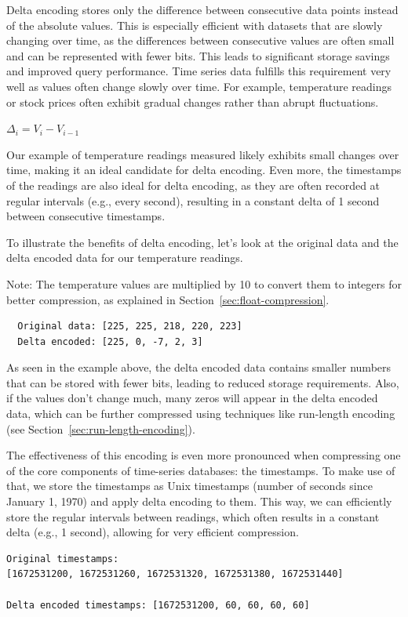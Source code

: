 Delta encoding stores only the difference between consecutive data points
instead of the absolute values. This is especially efficient with datasets that
are slowly changing over time, as the differences between consecutive values
are often small and can be represented with fewer bits. This leads to
significant storage savings and improved query performance. Time series data
fulfills this requirement very well as values often change slowly over time.
For example, temperature readings or stock prices often exhibit gradual changes
rather than abrupt fluctuations.

$\Delta_i = V_i - V_{i-1}$

Our example of temperature readings measured likely exhibits small changes over
time, making it an ideal candidate for delta encoding. Even more, the
timestamps of the readings are also ideal for delta encoding, as they are often
recorded at regular intervals (e.g., every second), resulting in a constant
delta of 1 second between consecutive timestamps.

To illustrate the benefits of delta encoding, let's look at the original data
and the delta encoded data for our temperature readings.

Note: The temperature values are multiplied by 10 to convert them to integers
for better compression, as explained in Section~\ref{sec:float-compression}.
\begin{verbatim}
  Original data: [225, 225, 218, 220, 223]
  Delta encoded: [225, 0, -7, 2, 3]
\end{verbatim}

As seen in the example above, the delta encoded data contains smaller numbers
that can be stored with fewer bits, leading to reduced storage requirements.
Also, if the values don't change much, many zeros will appear in the delta
encoded data, which can be further compressed using techniques like run-length
encoding (see Section~\ref{sec:run-length-encoding}).

The effectiveness of this encoding is even more pronounced when compressing one
of the core components of time-series databases: the timestamps. To make use of
that, we store the timestamps as Unix timestamps (number of seconds since
January 1, 1970) and apply delta encoding to them. This way, we can efficiently
store the regular intervals between readings, which often results in a constant
delta (e.g., 1 second), allowing for very efficient compression.

\begin{verbatim}
Original timestamps:
[1672531200, 1672531260, 1672531320, 1672531380, 1672531440]

Delta encoded timestamps: [1672531200, 60, 60, 60, 60]
\end{verbatim}

